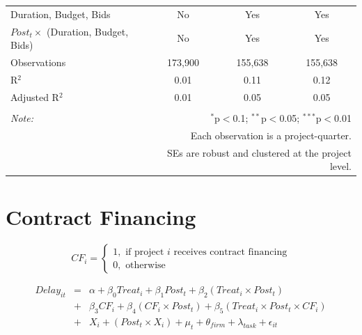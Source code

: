 \documentclass[
]{article}
\begin{document}
\begin{table}[H]
\begin{tabular}{@{\extracolsep{-2pt}}lccc}
Duration, Budget, Bids & No & Yes & Yes \\ 
$Post_t \times$  (Duration, Budget, Bids) & No & Yes & Yes \\ 
Observations & 173,900 & 155,638 & 155,638 \\ 
R$^{2}$ & 0.01 & 0.11 & 0.12 \\ 
Adjusted R$^{2}$ & 0.01 & 0.05 & 0.05 \\ 
\hline 
\hline \\[-1.8ex] 
\textit{Note:}  & \multicolumn{3}{r}{$^{*}$p$<$0.1; $^{**}$p$<$0.05; $^{***}$p$<$0.01} \\ 
 & \multicolumn{3}{r}{Each observation is a project-quarter.} \\ 
 & \multicolumn{3}{r}{SEs are robust and clustered at the project level.} \\ 
\end{tabular} 
\end{table}

\hypertarget{contract-financing}{%
\section{Contract Financing}\label{contract-financing}}

\[ CF_i = \begin{cases} 1, \text{ if project } i \text{ receives contract financing}\\
0, \text{ otherwise} \end{cases}\]

\[ \begin{aligned}
Delay_{it} &=& \alpha+\beta_0 Treat_i + \beta_1 Post_t + \beta_2 (Treat_i \times Post_t) \\
&+&\beta_3 CF_i + \beta_4 (CF_i \times Post_t) + \beta_5 (Treat_i \times Post_t \times CF_i) \\ 
&+&X_i + (Post_t \times X_i) + \mu_t + \theta_{firm} + \lambda_{task}+ \epsilon_{it}
\end{aligned}\]
\end{document}
